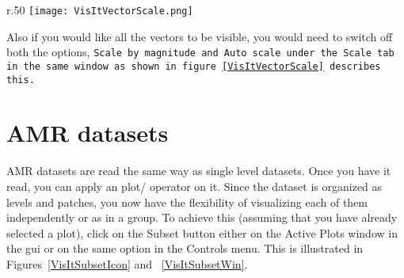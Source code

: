 \begin{wrapfigure}{r}{.50\textwidth}
  \center
  \vspace{-50pts}
  \texttt{[image: VisItVectorScale.png]}
  \caption{Increasing the scale of Vectors}
  \vspace{-30pts}
  \label{VisItVectorScale}
\end{wrapfigure}


Also if you would like all the vectors to be visible, you would need
to switch off both the options, \tt Scale by magnitude \normalfont and
\tt Auto scale \normalfont under the Scale tab in the same window as
shown in figure~\ref{VisItVectorScale} describes this.


\section{AMR datasets}



AMR datasets are read the same way as single level datasets. Once you
have it read, you can apply an plot/ operator on it. Since the dataset
is organized as levels and patches, you now have the flexibility of
visualizing each of them independently or as in a group. To achieve
this (assuming that you have already selected a plot), click on the
Subset button either on the Active Plots window in the gui or on the
same option in the Controls menu. This is illustrated in
Figures~\ref{VisItSubsetIcon} and ~\ref{VisItSubsetWin}.



\begin{figure}
  \centering
  \vspace{-80pt}
  \hspace{50pt}
  \caption{}
  \vspace{-10pt}
  \label{}
\end{figure}


